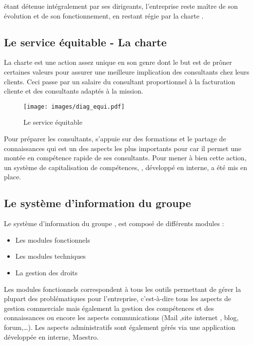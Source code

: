 \ebi{} étant détenue intégralement par ses dirigeants, l'entreprise reste maître de son évolution et de son fonctionnement, en restant régie par la charte \excilys{}.

\subsection{Le service équitable - La charte \excilys{}}

La charte \excilys{} est une action assez unique en son genre dont le but est de prôner certaines valeurs pour assurer une meilleure implication des consultants chez leurs clients. Ceci passe par un salaire du consultant proportionnel à la facturation cliente et des consultants adaptés à la mission.

\begin{figure}[H]
	\centering
	\texttt{[image: images/diag\_equi.pdf]}
	\caption{Le service équitable}
\end{figure}

Pour préparer les consultants, \ebi{} s'appuie sur des formations et le partage de connaissances qui est un des aspects les plus importants pour \excilys{} car il permet une montée en compétence rapide de ses consultants. Pour mener à bien cette action, un système de capitalisation de compétences, \capico{} \cite{capico}, développé en interne, a été mis en place.

\subsection{Le système d'information du groupe}

Le système d'information du groupe \excilys{}, est composé de différents modules : 

\begin{itemize}
	\item Les modules fonctionnels 
	\item Les modules techniques
	\item La gestion des droits\\
\end{itemize}

Les modules fonctionnels correspondent à tous les outils permettant de gérer la plupart des problématiques pour l'entreprise, c’est-à-dire tous les aspects de gestion commerciale mais également la gestion des compétences et des connaissances ou encore les aspects communications (Mail ,site internet , blog, forum,\ldots). Les aspects administratifs sont également gérés via une application développée en interne, Maestro.\\

